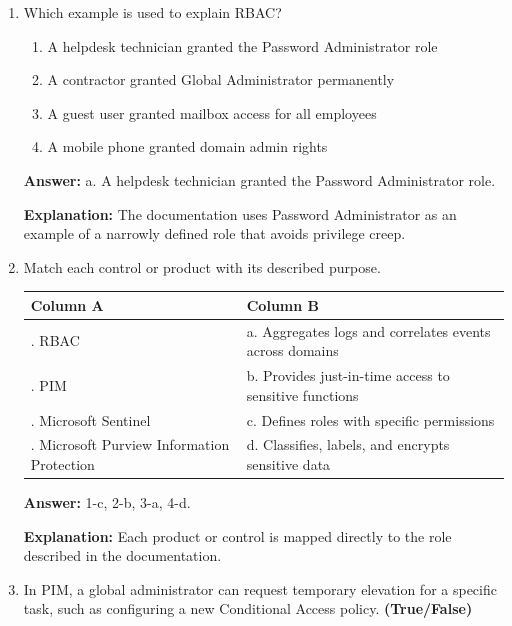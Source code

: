 \documentclass[10pt]{article}
\begin{document}
\begin{enumerate}[leftmargin=*]
\textbf{Explanation:} RBAC provides predefined permission roles, and PIM adds just-in-time access to sensitive functions.

\item Which example is used to explain RBAC?
\begin{enumerate}[label=\alph*., leftmargin=1.5em]
\item A helpdesk technician granted the Password Administrator role
\item A contractor granted Global Administrator permanently
\item A guest user granted mailbox access for all employees
\item A mobile phone granted domain admin rights
\end{enumerate}
\textbf{Answer:} a. A helpdesk technician granted the Password Administrator role.

\textbf{Explanation:} The documentation uses Password Administrator as an example of a narrowly defined role that avoids privilege creep.

\item Match each control or product with its described purpose.

\begin{center}
\begin{tabular}{>{\raggedright\arraybackslash}p{} >{\raggedright\arraybackslash}p{}}
\toprule
\textbf{Column A} & \textbf{Column B} \\
\midrule
1. RBAC & a. Aggregates logs and correlates events across domains \\
2. PIM & b. Provides just-in-time access to sensitive functions \\
3. Microsoft Sentinel & c. Defines roles with specific permissions \\
4. Microsoft Purview Information Protection & d. Classifies, labels, and encrypts sensitive data \\
\bottomrule
\end{tabular}
\end{center}

\textbf{Answer:} 1-c, 2-b, 3-a, 4-d.

\textbf{Explanation:} Each product or control is mapped directly to the role described in the documentation.

\item In PIM, a global administrator can request temporary elevation for a specific task, such as configuring a new Conditional Access policy. \textbf{(True/False)}


\end{enumerate}
\end{document}
